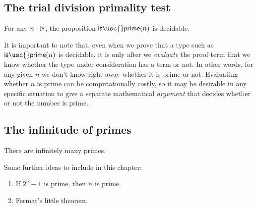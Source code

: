 \subsection{The trial division primality test}

\begin{thm}
  For any $n:{\mathbb{N}}$, the proposition $\mathsf{is\usc{}prime}(n)$ is decidable.
\end{thm}

It is important to note that, even when we prove that a type such as $\mathsf{is\usc{}prime}(n)$ is decidable, it is only after we \emph{evaluate} the proof term that we know whether the type under consideration has a term or not. In other words, for any given $n$ we don't know right away whether it is prime or not. Evaluating whether $n$ is prime can be computationally costly, so it may be desirable in any specific situation to give a separate mathematical \emph{argument} that decides whether or not the number is prime.

\subsection{The infinitude of primes}

\begin{thm}
  There are infinitely many primes.
\end{thm}

Some further ideas to include in this chapter:
\begin{enumerate}
\item If $2^n-1$ is prime, then $n$ is prime.
\item Fermat's little theorem.
\end{enumerate}

